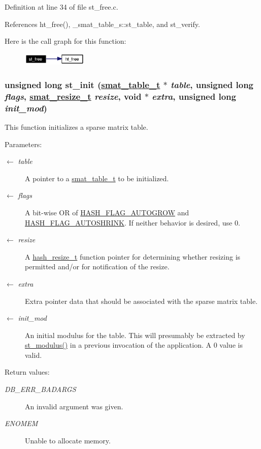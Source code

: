 Definition at line 34 of file st\_\-free.c.

References ht\_\-free(), \_\-smat\_\-table\_\-s::st\_\-table, and st\_\-verify.

Here is the call graph for this function:\begin{figure}[H]
\begin{center}
\leavevmode
\includegraphics[width=88pt]{group__dbprim__smat_ga17_cgraph}
\end{center}
\end{figure}
\hypertarget{group__dbprim__smat_ga10}{
\subsubsection[st\_\-init]{\setlength{\rightskip}{0pt plus 5cm}unsigned long st\_\-init (\hyperlink{struct__smat__table__s}{smat\_\-table\_\-t} $\ast$ {\em table}, unsigned long {\em flags}, \hyperlink{group__dbprim__smat_ga3}{smat\_\-resize\_\-t} {\em resize}, void $\ast$ {\em extra}, unsigned long {\em init\_\-mod})}}
\label{group__dbprim__smat_ga10}


This function initializes a sparse matrix table.

\begin{Desc}
\item[Parameters:]
\begin{description}
\item[\mbox{$\leftarrow$} {\em table}]A pointer to a \hyperlink{group__dbprim__smat_ga0}{smat\_\-table\_\-t} to be initialized. \item[\mbox{$\leftarrow$} {\em flags}]A bit-wise OR of \hyperlink{group__dbprim__hash_ga23}{HASH\_\-FLAG\_\-AUTOGROW} and \hyperlink{group__dbprim__hash_ga24}{HASH\_\-FLAG\_\-AUTOSHRINK}. If neither behavior is desired, use 0. \item[\mbox{$\leftarrow$} {\em resize}]A \hyperlink{group__dbprim__hash_ga6}{hash\_\-resize\_\-t} function pointer for determining whether resizing is permitted and/or for notification of the resize. \item[\mbox{$\leftarrow$} {\em extra}]Extra pointer data that should be associated with the sparse matrix table. \item[\mbox{$\leftarrow$} {\em init\_\-mod}]An initial modulus for the table. This will presumably be extracted by \hyperlink{group__dbprim__smat_ga37}{st\_\-modulus()} in a previous invocation of the application. A 0 value is valid.\end{description}
\end{Desc}
\begin{Desc}
\item[Return values:]
\begin{description}
\item[{\em DB\_\-ERR\_\-BADARGS}]An invalid argument was given. \item[{\em ENOMEM}]Unable to allocate memory.\end{description}
\end{Desc}


